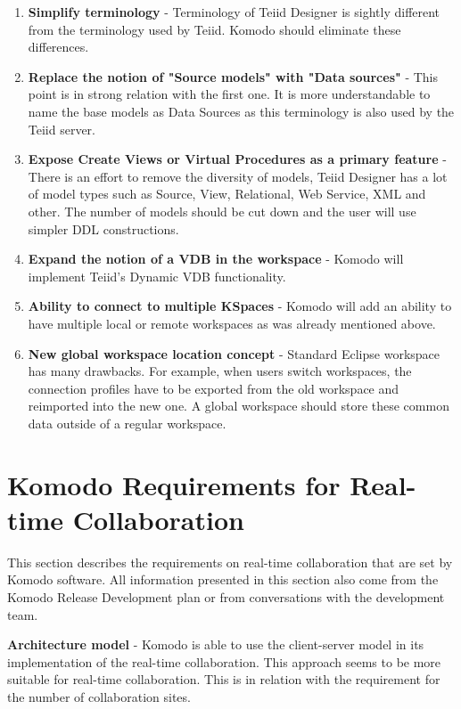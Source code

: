 \documentclass[12pt,oneside]{fithesis2}
\begin{document}
\begin{enumerate}
\item \textbf{Simplify terminology} - Terminology of Teiid Designer is sightly different from the terminology used by Teiid. Komodo should eliminate these differences.
\item \textbf{Replace the notion of "Source models" with "Data sources" }- This point is in strong relation with the first one. It is more understandable to name the base models as Data Sources as this terminology is also used by the Teiid server.
\item \textbf{Expose Create Views or Virtual Procedures as a primary feature} - There is an effort to remove the diversity of models, Teiid Designer has a lot of model types such as Source, View, Relational, Web Service, XML and other. The number of models should be cut down and the user will use simpler DDL constructions.
\item \textbf{Expand the notion of a VDB in the workspace} - Komodo will implement Teiid's Dynamic VDB functionality.
\item \textbf{Ability to connect to multiple KSpaces} - Komodo will add an ability to have multiple local or remote workspaces as was already mentioned above.
\item \textbf{New global workspace location concept} - Standard Eclipse workspace has many drawbacks. For example, when users switch workspaces, the connection profiles have to be exported from the old workspace and reimported into the new one. A global workspace should store these common data outside of a regular workspace.
\end{enumerate}
\section{Komodo Requirements for Real-time Collaboration} \label{requirements}
\par This section describes the requirements on real-time collaboration that are set by Komodo software. All information presented in this section also come from the Komodo Release Development plan \cite{Komodo} or from conversations with the development team.

\vspace{3mm} 

\textbf{Architecture model} - Komodo is able to use the client-server model in its implementation of the real-time collaboration. This approach seems to be more suitable for real-time collaboration. This is in relation with the requirement for the number of collaboration sites.
\end{document}
